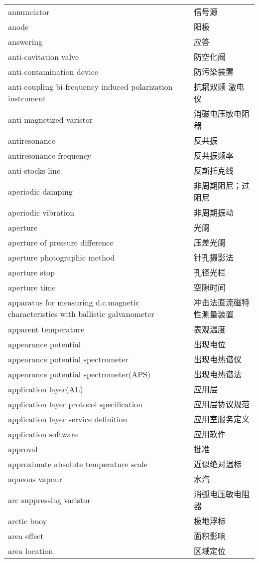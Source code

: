 \documentclass[
]{article}
\begin{document}
\begin{longtable}[]{@{}ll@{}}
annunciator & 信号源 \\
anode & 阳极 \\
answering & 应答 \\
anti-cavitation valve & 防空化阀 \\
anti-contamination device & 防污染装置 \\
anti-coupling bi-frequency induced polarization instrument & 抗耦双频
激电仪 \\
anti-magnetized varistor & 消磁电压敏电阻器 \\
antiresonance & 反共振 \\
antiresonance frequency & 反共振频率 \\
anti-stocks line & 反斯托克线 \\
aperiodic damping & 非周期阻尼；过阻尼 \\
aperiodic vibration & 非周期振动 \\
aperture & 光阑 \\
aperture of pressure difference & 压差光阑 \\
aperture photographic method & 针孔摄影法 \\
aperture stop & 孔径光栏 \\
aperture time & 空隙时间 \\
apparatus for measuring d.c.magnetic characteristics with ballistic
galvanometer & 冲击法直流磁特性测量装置 \\
apparent temperature & 表观温度 \\
appearance potential & 出现电位 \\
appearance potential spectrometer & 出现电热谱仪 \\
appearance potential spectrometer(APS) & 出现电热谱法 \\
application layer(AL) & 应用层 \\
application layer protocol specification & 应用层协议规范 \\
application layer service definition & 应用室服务定义 \\
application software & 应用软件 \\
approval & 批准 \\
approximate absolute temperature scale & 近似绝对温标 \\
aqueous vapour & 水汽 \\
arc suppressing varistor & 消弧电压敏电阻器 \\
arctic buoy & 极地浮标 \\
area effect & 面积影响 \\
area location & 区域定位 \\

\end{longtable}
\end{document}
